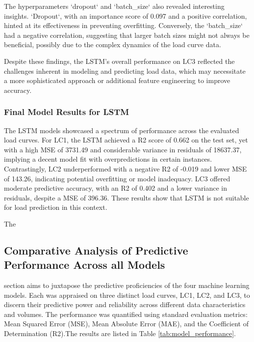 \documentclass{article} %
\begin{document}
The hyperparameters `dropout` and `batch\_size` also revealed interesting insights. `Dropout`, with an importance score of 0.097 and a positive correlation, hinted at its effectiveness in preventing overfitting. Conversely, the `batch\_size` had a negative correlation, suggesting that larger batch sizes might not always be beneficial, possibly due to the complex dynamics of the load curve data.

Despite these findings, the \gls{LSTM}'s overall performance on \gls{LC3} reflected the challenges inherent in modeling and predicting load data, which may necessitate a more sophisticated approach or additional feature engineering to improve accuracy.

\subsubsection{Final Model Results for LSTM}

The \gls{LSTM} models showcased a spectrum of performance across the evaluated load curves. For \gls{LC1}, the \gls{LSTM} achieved a \gls{R2} score of 0.662 on the test set, yet with a high \gls{MSE} of 3731.49 and considerable variance in residuals of 18637.37, implying a decent model fit with overpredictions in certain instances. Contrastingly, \gls{LC2} underperformed with a negative \gls{R2} of -0.019 and lower \gls{MSE} of 143.26, indicating potential overfitting or model inadequacy. \gls{LC3} offered moderate predictive accuracy, with an \gls{R2} of 0.402 and a lower variance in residuals, despite a \gls{MSE} of 396.36. 
These results show that \gls{LSTM} is not suitable for load prediction in this context.



The \subsection{Comparative Analysis of Predictive Performance Across all Models} section aims to juxtapose the predictive proficiencies of the four machine learning models. Each was appraised on three distinct load curves, \gls{LC1}, \gls{LC2}, and \gls{LC3}, to discern their predictive power and reliability across different data characteristics and volumes. The performance was quantified using standard evaluation metrics: Mean Squared Error (\gls{MSE}), Mean Absolute Error (\gls{MAE}), and the Coefficient of Determination (\gls{R2}).The results are listed in Table \ref{tab:model_performance}.
\end{document}
